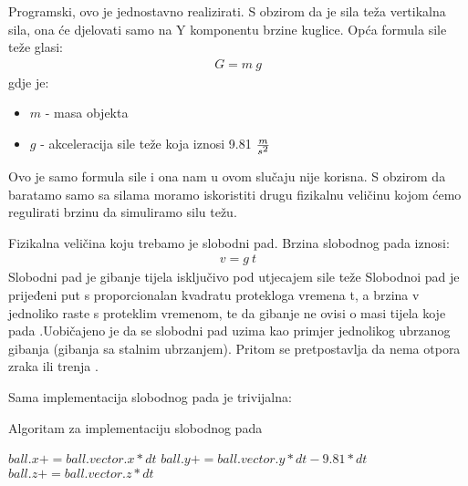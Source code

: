 Programski, ovo je jednostavno realizirati. S obzirom da je sila teža vertikalna sila, ona će djelovati samo na Y komponentu brzine kuglice. Opća formula sile teže glasi:
\begin{equation} \label{equ:sila_teza}
	\begin{aligned}
		G = m \ g
	\end{aligned}
\end{equation}
gdje je:
\begin{itemize}
	\item $m$ - masa objekta
	\item $g$ - akceleracija sile teže koja iznosi 9.81 $\frac{m}{s\textsuperscript{2}}$
\end{itemize}
Ovo je samo formula sile i ona nam u ovom slučaju nije korisna. S obzirom da baratamo samo sa silama moramo iskoristiti drugu fizikalnu veličinu kojom ćemo regulirati brzinu da simuliramo silu težu. 

Fizikalna veličina koju trebamo je slobodni pad. Brzina slobodnog pada iznosi:
\begin{equation}\label{slobodni_pad}
	\begin{aligned}
		v = g \ t
	\end{aligned}
\end{equation}
Slobodni pad je gibanje tijela isključivo pod utjecajem sile teže Slobodnoi pad je prijeđeni put s proporcionalan kvadratu protekloga vremena t, a brzina v jednoliko raste s proteklim vremenom, te da gibanje ne ovisi o masi tijela koje pada \cite{10}.Uobičajeno je da se slobodni pad uzima kao primjer jednolikog ubrzanog gibanja (gibanja sa stalnim ubrzanjem). Pritom se pretpostavlja da nema otpora zraka ili trenja \cite{10}.

Sama implementacija slobodnog pada je trivijalna:
\begin{algorithm}
	\caption{Algoritam za implementaciju slobodnog pada}
	\label{alg:free_fall}
	\begin{algorithmic}
		\State $ball.x += ball.vector.x * dt$
		\State $ball.y += ball.vector.y * dt - 9.81 * dt$
		\State $ball.z += ball.vector.z * dt$
		\EndFunction
	\end{algorithmic}
\end{algorithm}

